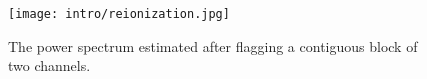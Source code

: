 \begin{figure}[th]
	\centering
	\texttt{[image: intro/reionization.jpg]}
	\caption[Epoch of Reionization Timeline]{The power spectrum estimated after flagging a contiguous block of two channels.}
	\label{fig:reionization}
\end{figure}
